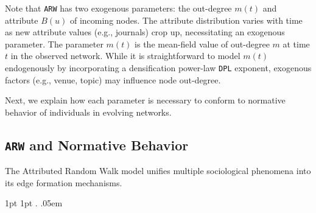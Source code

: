 Note that \texttt{ARW} has two exogenous parameters: the out-degree
$m(t)$ and attribute $B(u)$ of incoming nodes.
The attribute distribution varies with time as new attribute values (e.g., journals) crop up, necessitating an exogenous
parameter. The parameter $m(t)$ is the mean-field value
of out-degree $m$ at time $t$ in the observed network.
While it is straightforward to model $m(t)$
endogenously by incorporating a densification power-law \texttt{DPL} exponent,
exogenous factors (e.g., venue, topic) may influence node out-degree.

Next, we explain how each parameter is necessary to conform to normative
behavior of individuals in evolving networks.

\vspace{-9pt}
\subsection{\texttt{ARW} and Normative Behavior}
\label{sub:Model Interpretation}
The Attributed Random Walk model unifies multiple sociological phenomena
into its edge formation mechanisms.

  {1pt} %
  {1pt} %
  {\itshape} %
  {} %
  {\bfseries} %
  {.} %
  {.05em} %
  {} %

\theoremstyle{exampstyle} \newtheorem{ph}{Phenomenon}


